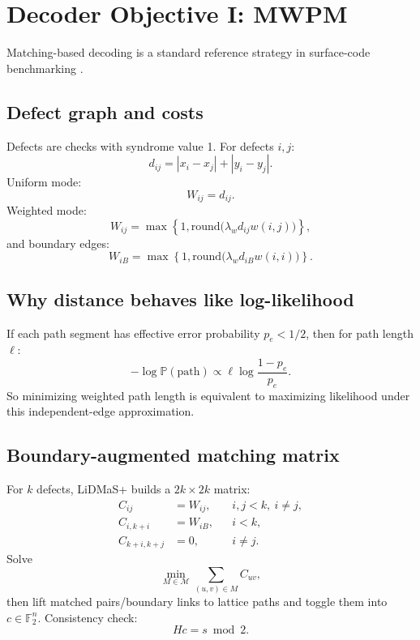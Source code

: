\documentclass[11pt]{article}
\newcommand{\F}{\mathbb{F}_2}
\newcommand{\Prb}{\mathbb{P}}
\begin{document}
\section{Decoder Objective I: MWPM}
Matching-based decoding is a standard reference strategy in surface-code benchmarking \cite{pymatching2021}.

\subsection{Defect graph and costs}
Defects are checks with syndrome value 1. For defects $i,j$:
\begin{equation}
d_{ij}=|x_i-x_j|+|y_i-y_j|.
\end{equation}
Uniform mode:
\begin{equation}
W_{ij}=d_{ij}.
\end{equation}
Weighted mode:
\begin{equation}
W_{ij}=\max\!\left\{1,\mathrm{round}\!\big(\lambda_w d_{ij}w(i,j)\big)\right\},
\end{equation}
and boundary edges:
\begin{equation}
W_{iB}=\max\!\left\{1,\mathrm{round}\!\big(\lambda_w d_{iB}w(i,i)\big)\right\}.
\end{equation}

\subsection{Why distance behaves like log-likelihood}
If each path segment has effective error probability $p_e<1/2$, then for path length $\ell$:
\begin{equation}
-\log \Prb(\text{path}) \propto \ell\log\frac{1-p_e}{p_e}.
\end{equation}
So minimizing weighted path length is equivalent to maximizing likelihood under this independent-edge approximation.

\subsection{Boundary-augmented matching matrix}
For $k$ defects, LiDMaS+ builds a $2k\times 2k$ matrix:
\begin{align}
C_{ij} &= W_{ij}, && i,j<k,\ i\neq j,\\
C_{i,k+i} &= W_{iB}, && i<k,\\
C_{k+i,k+j} &= 0, && i\neq j.
\end{align}
Solve
\begin{equation}
\min_{M\in\mathcal M}\sum_{(u,v)\in M}C_{uv},
\end{equation}
then lift matched pairs/boundary links to lattice paths and toggle them into $c\in\F^n$.
Consistency check:
\begin{equation}
Hc=s\bmod 2.
\end{equation}
\end{document}
